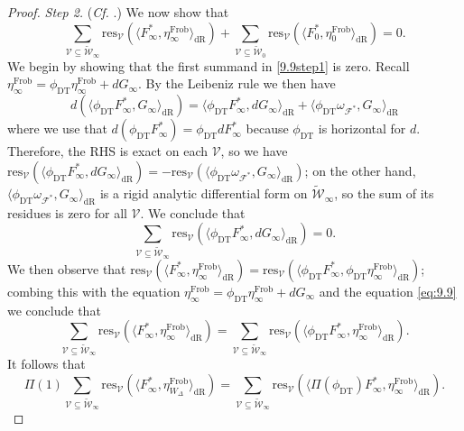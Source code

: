 \documentclass[a4paper,11pt]{amsart}
\numberwithin{equation}{section}
\theoremstyle{plain}
\theoremstyle{definition}
\theoremstyle{remark}
\DeclareMathOperator{\Frob}{Frob}
\newcommand{\res}{\mathrm{res}}
\newcommand{\dR}{\mathrm{dR}}
\begin{document}
\begin{proof}
\emph{Step 2.} (\emph{Cf.} \cite[Lemma 3.20]{BDP}.) We now show that 
\begin{equation} \label{9.9step1} 
\sum_{\mathcal{V}\subseteq\widetilde{\mathcal{W}}_\infty}\res_{\mathcal{V}}(\langle F_\infty^*,\eta_{\infty}^{\mathrm{Frob}}\rangle_\dR) +\sum_{\mathcal{V}\subseteq\widetilde{\mathcal{W}}_0}\res_{\mathcal{V}}(\langle F_0^*,\eta_{0}^{\mathrm{Frob}}\rangle_\dR)=0.\end{equation}
We begin by showing that the first summand in \eqref{9.9step1} is zero. 
Recall $\eta_\infty^{\Frob}=\phi_\mathrm{DT}\eta_\infty^{\Frob}+dG_\infty$. By the Leibeniz rule we then have 
\[d(\langle \phi_\mathrm{DT} F_\infty^*,G_\infty\rangle_\dR)=\langle\phi_\mathrm{DT} F_\infty^*,dG_\infty\rangle_\dR+\langle \phi_\mathrm{DT}\omega_{\mathcal{F}^*},G_\infty\rangle_\dR\] where we use that $d(\phi_\mathrm{DT} F^*_\infty)=\phi_\mathrm{DT} d F_\infty^*$ because $\phi_\mathrm{DT}$ is horizontal for $d$. Therefore, the RHS is exact on each $\mathcal{V}$, so we have 
$\res_\mathcal{V}(\langle\phi_\mathrm{DT} F_\infty^*,dG_\infty\rangle_\dR)=-\res_\mathcal{V}(\langle \phi_\mathrm{DT}\omega_{\mathcal{F}^*},G_\infty\rangle_\dR)$; on the other hand, $\langle \phi_\mathrm{DT}\omega_{\mathcal{F}^*},G_\infty\rangle_\dR$ is a rigid analytic differential form on $\widetilde{\mathcal{W}}_\infty$, so the sum of its residues is zero for all $\mathcal{V}$. We conclude that 
\begin{equation}\label{eq:9.9} 
\sum_{\mathcal{V}\subseteq\widetilde{\mathcal{W}}_\infty}\res_\mathcal{V}(\langle\phi_\mathrm{DT} F_\infty^*,dG_\infty\rangle_\dR)=0.\end{equation} We then observe that 
$\res_{\mathcal{V}}(\langle F_\infty^*,\eta_{\infty}^{\mathrm{Frob}}\rangle_\dR)=
\res_{\mathcal{V}}(\langle \phi_\mathrm{DT} F_\infty^*,\phi_\mathrm{DT}\eta_{\infty}^{\mathrm{Frob}}\rangle_\dR)$; combing this with the equation $\eta_\infty^{\Frob}=\phi_\mathrm{DT}\eta_\infty^{\Frob}+dG_\infty$ and the equation \eqref{eq:9.9} we conclude that 
\[\sum_{\mathcal{V}\subseteq\widetilde{\mathcal{W}}_\infty}\res_{\mathcal{V}}(\langle F_\infty^*,\eta_{\infty}^{\mathrm{Frob}}\rangle_\dR)=\sum_{\mathcal{V}\subseteq\widetilde{\mathcal{W}}_\infty}\res_{\mathcal{V}}(\langle \phi_\mathrm{DT} F_\infty^*,\eta_{\infty}^{\mathrm{Frob}}\rangle_\dR).\] It follows that 
\[\Pi(1)\sum_{\mathcal{V}\subseteq\widetilde{\mathcal{W}}_\infty}\res_{\mathcal{V}}(\langle F_\infty^*,\eta_{W_\Delta}^{\mathrm{Frob}}\rangle_\dR)=\sum_{\mathcal{V}\subseteq\widetilde{\mathcal{W}}_\infty}\res_{\mathcal{V}}(\langle \Pi(\phi_\mathrm{DT} )F_\infty^*,\eta_{\infty}^{\mathrm{Frob}}\rangle_\dR).\]

\end{proof}
\end{document}
